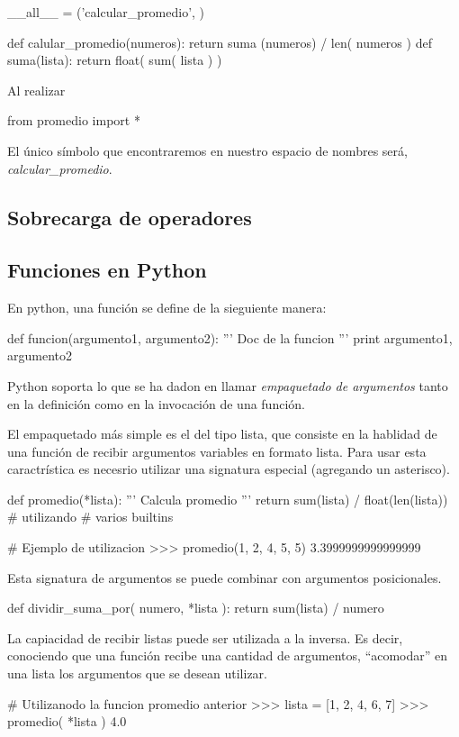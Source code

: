 \documentclass[a4paper]{report}
\begin{document}
\begin{python}
__all__ = ('calcular_promedio', )

def calular_promedio(numeros):
    return suma (numeros) / len( numeros )
def suma(lista):
    return float( sum( lista ) ) 
\end{python}

Al realizar
\begin{python}
 from promedio import *
\end{python}

El único símbolo que encontraremos en nuestro espacio de nombres será, \emph{calcular\_promedio}.
\subsection{Sobrecarga de operadores}

\subsection{Funciones en Python}
En python, una función se define de la sieguiente manera:
\begin{python}
def funcion(argumento1, argumento2):
  ''' Doc de la funcion '''
  print argumento1, argumento2
\end{python}
Python soporta lo que se ha dadon en llamar \emph{empaquetado de argumentos } tanto en la 
definición como en la invocación de una función.

El empaquetado más simple es el del tipo lista, que consiste en la hablidad de una función de
recibir argumentos variables en formato lista. Para usar esta caractrística es necesrio utilizar
una signatura especial (agregando un asterisco).

\begin{python}
def promedio(*lista):
  ''' Calcula promedio '''
  return sum(lista) / float(len(lista)) # utilizando 
					# varios builtins

# Ejemplo de utilizacion
>>> promedio(1, 2, 4, 5, 5)
3.3999999999999999

\end{python}
Esta signatura de argumentos se puede combinar con argumentos posicionales.
\begin{python}
def dividir_suma_por( numero, *lista ):
  return sum(lista) / numero
\end{python}
La capiacidad de recibir listas puede ser utilizada a la inversa. Es decir, conociendo que una función
recibe una cantidad de argumentos, ``acomodar'' en una lista los argumentos que se desean utilizar.
\begin{python}
# Utilizanodo la funcion promedio anterior
>>> lista = [1, 2, 4, 6, 7]
>>> promedio( *lista )
4.0
\end{python}
\end{document}
